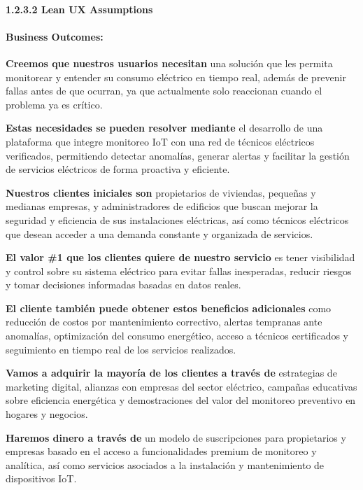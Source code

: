 \paragraph{1.2.3.2 Lean UX
Assumptions}\label{report__10-cap1-introduccion.md__lean-ux-assumptions}

\paragraph{Business
Outcomes:}\label{report__10-cap1-introduccion.md__business-outcomes}

\hfill\break
\textbf{Creemos que nuestros usuarios necesitan} una solución que les
permita monitorear y entender su consumo eléctrico en tiempo real,
además de prevenir fallas antes de que ocurran, ya que actualmente solo
reaccionan cuando el problema ya es crítico.

\textbf{Estas necesidades se pueden resolver mediante} el desarrollo de
una plataforma que integre monitoreo IoT con una red de técnicos
eléctricos verificados, permitiendo detectar anomalías, generar alertas
y facilitar la gestión de servicios eléctricos de forma proactiva y
eficiente.

\textbf{Nuestros clientes iniciales son} propietarios de viviendas,
pequeñas y medianas empresas, y administradores de edificios que buscan
mejorar la seguridad y eficiencia de sus instalaciones eléctricas, así
como técnicos eléctricos que desean acceder a una demanda constante y
organizada de servicios.

\textbf{El valor \#1 que los clientes quiere de nuestro servicio} es
tener visibilidad y control sobre su sistema eléctrico para evitar
fallas inesperadas, reducir riesgos y tomar decisiones informadas
basadas en datos reales.

\textbf{El cliente también puede obtener estos beneficios adicionales}
como reducción de costos por mantenimiento correctivo, alertas tempranas
ante anomalías, optimización del consumo energético, acceso a técnicos
certificados y seguimiento en tiempo real de los servicios realizados.

\textbf{Vamos a adquirir la mayoría de los clientes a través de}
estrategias de marketing digital, alianzas con empresas del sector
eléctrico, campañas educativas sobre eficiencia energética y
demostraciones del valor del monitoreo preventivo en hogares y negocios.

\textbf{Haremos dinero a través de} un modelo de suscripciones para
propietarios y empresas basado en el acceso a funcionalidades premium de
monitoreo y analítica, así como servicios asociados a la instalación y
mantenimiento de dispositivos IoT.

